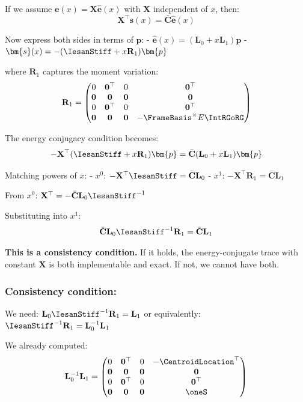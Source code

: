 If we assume \(\bm{e}(x) = \mathbf{X}\hat{\bm{e}}(x)\) with
\(\mathbf{X}\) independent of \(x\), then:
\[\mathbf{X}^\top \bm{s}(x) = \bar{\mathbf{C}} \hat{\bm{e}}(x)\]

Now express both sides in terms of \(\bm{p}\): -
\(\hat{\bm{e}}(x) = (\mathbf{L}_0 + x\mathbf{L}_1)\bm{p}\) -
\(\bm{s}(x) = -(\IesanStiff + x\mathbf{R}_1)\bm{p}\)

where \(\mathbf{R}_1\) captures the moment variation:
\[\mathbf{R}_1 = \begin{pmatrix}
0 & \mathbf{0}^\top & 0 & \mathbf{0}^\top \\
\mathbf{0} & \mathbf{0} & \mathbf{0} & \mathbf{0} \\
0 & \mathbf{0}^\top & 0 & \mathbf{0}^\top \\
\mathbf{0} & \mathbf{0} & \mathbf{0} & -\FrameBasis^\times E\IntRGoRG
\end{pmatrix}\]

The energy conjugacy condition becomes:
\[-\mathbf{X}^\top (\IesanStiff + x\mathbf{R}_1)\bm{p} = \bar{\mathbf{C}} (\mathbf{L}_0 + x\mathbf{L}_1)\bm{p}\]

Matching powers of \(x\): - \(x^0\):
\(-\mathbf{X}^\top \IesanStiff = \bar{\mathbf{C}} \mathbf{L}_0\) -
\(x^1\):
\(-\mathbf{X}^\top \mathbf{R}_1 = \bar{\mathbf{C}} \mathbf{L}_1\)

From \(x^0\):
\(\mathbf{X}^\top = -\bar{\mathbf{C}} \mathbf{L}_0 \IesanStiff^{-1}\)

Substituting into \(x^1\):
\[\bar{\mathbf{C}} \mathbf{L}_0 \IesanStiff^{-1} \mathbf{R}_1 = \bar{\mathbf{C}} \mathbf{L}_1\]

\textbf{This is a consistency condition.} If it holds, the
energy-conjugate trace with constant \(\mathbf{X}\) is both
implementable and exact. If not, we cannot have both.

\subsubsection{Consistency condition:}

We need: \(\mathbf{L}_0 \IesanStiff^{-1} \mathbf{R}_1 = \mathbf{L}_1\)
or equivalently:
\(\IesanStiff^{-1} \mathbf{R}_1 = \mathbf{L}_0^{-1} \mathbf{L}_1\)

We already computed: \[\mathbf{L}_0^{-1}\mathbf{L}_1 = \begin{pmatrix}
0 & \mathbf{0}^\top & 0 & -\CentroidLocation^\top \\
\mathbf{0} & \mathbf{0} & \mathbf{0} & \mathbf{0} \\
0 & \mathbf{0}^\top & 0 & \mathbf{0}^\top \\
\mathbf{0} & \mathbf{0} & \mathbf{0} & \oneS
\end{pmatrix}\]

